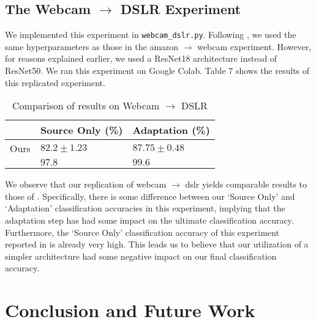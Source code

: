 \documentclass[14pt]{extarticle}
\begin{document}
		\subsection{The Webcam $\rightarrow$ DSLR Experiment}
		We implemented this experiment in \texttt{webcam\_dslr.py}. Following \cite{adda}, we used the same hyperparameters as those in the amazon $\rightarrow$ webcam experiment. However, for reasons explained earlier, we used a ResNet18 architecture instead of ResNet50. We ran this experiment on Google Colab. Table 7 shows the results of this replicated experiment.
		\begin{table}[H]
			\centering
			\begin{tabular}{|P{40mm}|P{40mm}|P{40mm}|}
				\hline
				 & Source Only (\%) & Adaptation (\%)\\
				\hline
				Ours & $82.2 \pm 1.23$ & $87.75 \pm 0.48$\\
				\hline
				\cite{adda} & $97.8$ & $99.6$\\
				\hline
			\end{tabular}
			\caption{Comparison of results on Webcam $\rightarrow$ DSLR}
		\end{table}
		We observe that our replication of webcam $\rightarrow$ dslr yields comparable results to those of \cite{adda}. Specifically, there is some difference between our `Source Only' and `Adaptation' classification accuracies in this experiment, implying that the adaptation step has had some impact on the ultimate classification accuracy. Furthermore, the `Source Only' classification accuracy of this experiment reported in \cite{adda} is already very high. This leads us to believe that our utilization of a simpler architecture had some negative impact on our final classification accuracy.
		\section{Conclusion and Future Work}
	
	
\end{document}
